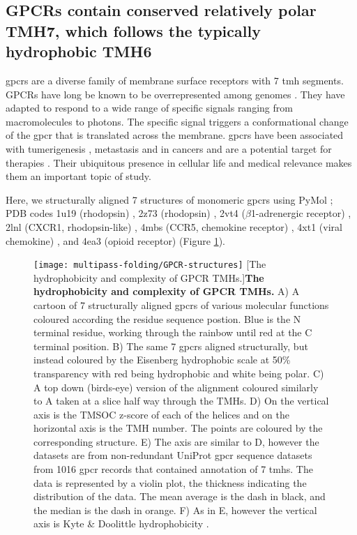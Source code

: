 \subsection{GPCRs contain conserved relatively polar TMH7, which follows the typically hydrophobic TMH6}

\gls{gpcr}s are a diverse family of membrane surface receptors with 7 \gls{tmh} segments.
GPCRs have long be known to be overrepresented among genomes \cite{Remm2000}.
They have adapted to respond to a wide range of specific signals ranging from macromolecules to photons.
The specific signal triggers a conformational change of the \gls{gpcr} that is translated across the membrane.
\gls{gpcr}s have been associated with tumerigenesis \cite{OHayre2013}, metastasis \cite{Singh2015} and in cancers \cite{Bar-Shavit2016} and are a potential target for therapies \cite{Arakaki2018}.
Their ubiquitous presence in cellular life and medical relevance makes them an important topic of study.

Here, we structurally aligned 7 structures of monomeric \gls{gpcr}s using PyMol \cite{DeLano2002};
PDB codes 1u19 (rhodopsin) \cite{Okada2004}, 2z73 (rhodopsin) \cite{Murakami2008}, 2vt4 ($\beta$1-adrenergic receptor) \cite{Warne2008}, 2lnl (CXCR1, rhodopsin-like) \cite{Park2012}, 4mbs (CCR5, chemokine receptor) \cite{Tan2013}, 4xt1 (viral chemokine) \cite{Burg2015}, and 4ea3 (opioid receptor) \cite{Thompson2012} (Figure \ref{fig:GPCR-structures}).

\begin{figure}[!ht]
\centering
\texttt{[image: multipass-folding/GPCR-structures]}
		[The hydrophobicity and complexity of GPCR TMHs.]{\textbf{The hydrophobicity and complexity of GPCR TMHs.}
    A) A cartoon of 7 structurally aligned \gls{gpcr}s of various molecular functions coloured according the residue sequence postion.
    Blue is the N terminal residue, working through the rainbow until red at the C terminal position.
    B) The same 7 \gls{gpcr}s aligned structurally, but instead coloured by the Eisenberg hydrophobic scale \cite{Eisenberg1984} at 50\% transparency with red being hydrophobic and white being polar.
    C) A top down (birds-eye) version of the alignment coloured similarly to A taken at a slice half way through the TMHs.
    D) On the vertical axis is the TMSOC z\--score of each of the helices and on the horizontal axis is the TMH number.
    The points are coloured by the corresponding structure.
    E) The axis are similar to D, however the datasets are from non-redundant UniProt \gls{gpcr} sequence datasets from 1016 \gls{gpcr} records that contained annotation of 7 \gls{tmh}s.
    The data is represented by a violin plot, the thickness indicating the distribution of the data.
    The mean average is the dash in black, and the median is the dash in orange.
    F) As in E, however the vertical axis is Kyte \& Doolittle hydrophobicity \cite{Kyte1982}.}

\label{fig:GPCR-structures}
\end{figure}

